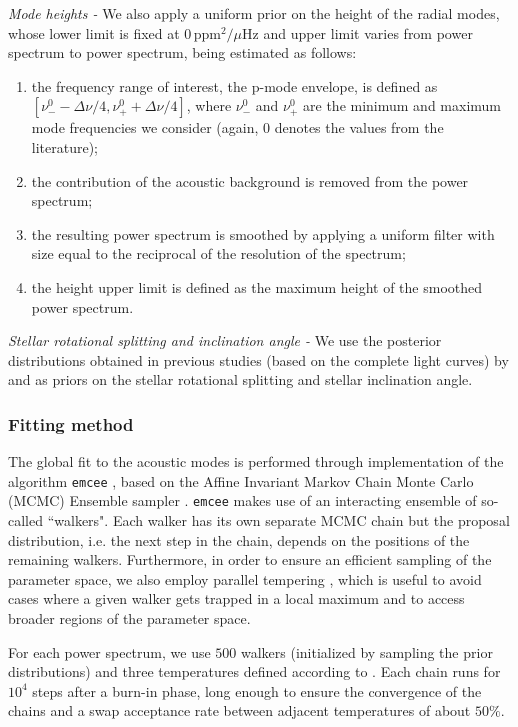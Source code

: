 \documentclass[twocolumn]{aastex61}%
\begin{document}
{\it Mode heights -} We also apply a uniform prior on the height of the radial modes, whose lower limit is fixed at $0\,\text{ppm}^2/\mu\text{Hz}$ and upper limit varies from power spectrum to power spectrum, being estimated as follows:
\begin{enumerate}
\item the frequency range of interest, the p-mode envelope, is defined as $[\nu_-^0-\Delta\nu/4,\nu_+^0+\Delta\nu/4]$, where $\nu_-^0$ and $\nu_+^0$ are the minimum and maximum mode frequencies we consider (again, 0 denotes the values from the literature);
\item the contribution of the acoustic background is removed from the power spectrum;
\item the resulting power spectrum is smoothed by applying a uniform filter with size equal to the reciprocal of the resolution of the spectrum;
\item the height upper limit is defined as the maximum height of the smoothed power spectrum.\\
\end{enumerate}

{\it Stellar rotational splitting and inclination angle -} We use the posterior distributions obtained in previous studies (based on the complete light curves) by \citet{Davies2016} and \citet{Lund2017} as priors on the stellar rotational splitting and stellar inclination angle.
\subsubsection{Fitting method}\label{sec:emcee}

The global fit to the acoustic modes is performed through implementation of the algorithm \texttt{emcee} \citep[][]{Foreman-Mackey2013}, based on the Affine Invariant Markov Chain Monte Carlo (MCMC) Ensemble sampler \citep[][]{Goodman2010}. \texttt{emcee} makes use of an interacting ensemble of so-called ``walkers". Each walker has its own separate MCMC chain but the proposal distribution, i.e. the next step in the chain, depends on the positions of the remaining walkers. Furthermore, in order to ensure an efficient sampling of the parameter space, we also employ parallel tempering \citep[][]{Earl2005}, which is useful to avoid cases where a given walker gets trapped in a local maximum and to access broader regions of the parameter space.

For each power spectrum, we use $500$ walkers (initialized by sampling the prior distributions) and three temperatures defined according to \citet{Benomar2009}. Each chain runs for $10^4$ steps after a burn-in phase, long enough to ensure the convergence of the chains and a swap acceptance rate between adjacent temperatures of about $50\%$.
\end{document}
